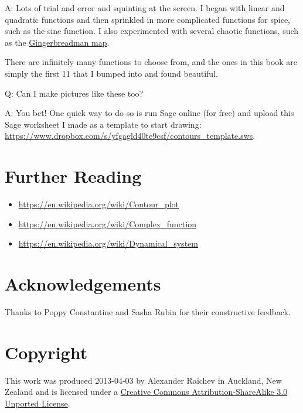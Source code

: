 \documentclass[12pt, a4paper]{amsart}
\begin{document}
A: Lots of trial and error and squinting at the screen.
I began with linear and quadratic functions and then sprinkled in more complicated functions for spice, such as the sine function.
I also experimented with several chaotic functions, such as the \href{https://en.wikipedia.org/wiki/Gingerbreadman_map}{Gingerbreadman map}.

There are infinitely many functions to choose from, and the ones in this book are simply the first 11 that I bumped into and found beautiful.

Q: Can I make pictures like these too?

A: You bet!
One quick way to do so is run Sage online (for free) and upload this Sage worksheet I made as a template to start drawing:
\url{https://www.dropbox.com/s/yfgagld40te9csf/contours_template.sws}.
\section*{Further Reading}

\begin{itemize}
    \item \url{https://en.wikipedia.org/wiki/Contour_plot}
    \item \url{https://en.wikipedia.org/wiki/Complex_function} 
    \item \url{https://en.wikipedia.org/wiki/Dynamical_system}
\end{itemize}
\section*{Acknowledgements}

Thanks to Poppy Constantine and Sasha Rubin for their constructive feedback.

\section*{Copyright}

This work was produced 2013-04-03 by Alexander Raichev in Auckland, New Zealand and is licensed under a \href{http://creativecommons.org/licenses/by-sa/3.0/deed.en_US}{Creative Commons Attribution-ShareAlike 3.0 Unported License}.
\end{document}
